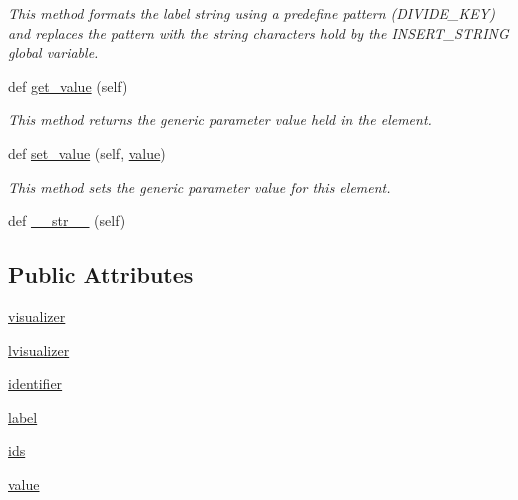 \begin{DoxyCompactItemize}
\begin{DoxyCompactList}\small\item\em This method formats the label string using a predefine pattern (D\+I\+V\+I\+D\+E\+\_\+\+K\+E\+Y) and replaces the pattern with the string characters hold by the I\+N\+S\+E\+R\+T\+\_\+\+S\+T\+R\+I\+N\+G global variable. \end{DoxyCompactList}\item 
def \hyperlink{class_bridges_1_1element_1_1_element_a823d51c9beb771d1e8286160ae6b7db3}{get\+\_\+value} (self)
\begin{DoxyCompactList}\small\item\em This method returns the generic parameter value held in the element. \end{DoxyCompactList}\item 
def \hyperlink{class_bridges_1_1element_1_1_element_a83180a28821ad37ed8df1f28267df1cf}{set\+\_\+value} (self, \hyperlink{class_bridges_1_1element_1_1_element_af18dea5cfca666c8e4ae29f1a464e7ea}{value})
\begin{DoxyCompactList}\small\item\em This method sets the generic parameter value for this element. \end{DoxyCompactList}\item 
def \hyperlink{class_bridges_1_1element_1_1_element_affacf899ae3b7215323848cde7583a2c}{\+\_\+\+\_\+str\+\_\+\+\_\+} (self)
\end{DoxyCompactItemize}
\subsection*{Public Attributes}
\begin{DoxyCompactItemize}
\item 
\hyperlink{class_bridges_1_1element_1_1_element_a929f63e3aaaeff971a1def438168559a}{visualizer}
\item 
\hyperlink{class_bridges_1_1element_1_1_element_a41950f899961e5eebd871ede8244792e}{lvisualizer}
\item 
\hyperlink{class_bridges_1_1element_1_1_element_a508cace0ae2f124b1933c1304fb063cf}{identifier}
\item 
\hyperlink{class_bridges_1_1element_1_1_element_a0aedaa53836e4af0c2d81a0a5b16115a}{label}
\item 
\hyperlink{class_bridges_1_1element_1_1_element_a8fdf33053fd2e19e47f7b96d4641ecc6}{ids}
\item 
\hyperlink{class_bridges_1_1element_1_1_element_a54928aa5d8a914e9394ba2fb0e7ef270}{value}
\end{DoxyCompactItemize}
